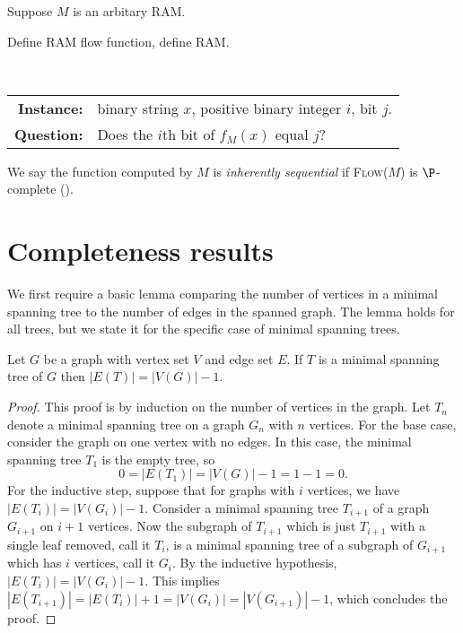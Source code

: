 \documentclass{article}
\begin{document}
Suppose $M$ is an arbitary RAM.

\begin{todo}
  Define RAM flow function, define RAM.
\end{todo}

\begin{definition}
  \mbox{} \\
  \begin{tabular}{r p{9.5cm}}
    \textbf{Instance:} & binary string $x$, positive binary integer $i$, bit $j$. \\
    \textbf{Question:} & Does the $i$th bit of $f_M(x)$ equal $j$?
  \end{tabular}
\end{definition}

We say the function computed by $M$ is \emph{inherently sequential} if \textsc{Flow($M$)} is $\P$-complete (\autocite[Definition~8.2.2]{ghr95}).

\section{Completeness results}

We first require a basic lemma comparing the number of vertices in a minimal spanning tree to the number of edges in the spanned graph.
The lemma holds for all trees, but we state it for the specific case of minimal spanning trees.
\begin{lemma}\label{lem:tree}
  Let $G$ be a graph with vertex set $V$ and edge set $E$.
  If $T$ is a minimal spanning tree of $G$ then $|E(T)| = |V(G)| - 1$.
\end{lemma}
\begin{proof}
  This proof is by induction on the number of vertices in the graph.
  Let $T_n$ denote a minimal spanning tree on a graph $G_n$ with $n$ vertices.
  For the base case, consider the graph on one vertex with no edges.
  In this case, the minimal spanning tree $T_1$ is the empty tree, so
  \begin{equation*}
    0 = |E(T_1)| = |V(G)| - 1 = 1 - 1 = 0.
  \end{equation*}
  For the inductive step, suppose that for graphs with $i$ vertices, we have $|E(T_i)| = |V(G_i)| - 1$.
  Consider a minimal spanning tree $T_{i + 1}$ of a graph $G_{i + 1}$ on $i + 1$ vertices.
  Now the subgraph of $T_{i + 1}$ which is just $T_{i + 1}$ with a single leaf removed, call it $T_i$, is a minimal spanning tree of a subgraph of $G_{i + 1}$ which has $i$ vertices, call it $G_i$.
  By the inductive hypothesis, $|E(T_i)| = |V(G_i)| - 1$.
  This implies $|E(T_{i + 1})| = |E(T_i)| + 1 = |V(G_i)| = |V(G_{i + 1})| - 1$, which concludes the proof.
\end{proof}
\end{document}
